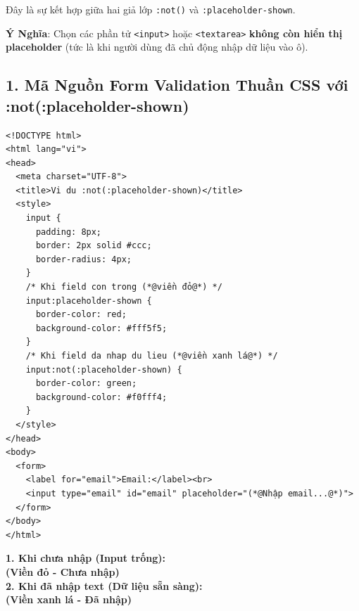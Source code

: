 \documentclass[11pt,oneside]{book}
\newcommand{\codeinline}[1]{\textcolor{accentOrange}{\texttt{#1}}}
\begin{document}
\begin{conceptBox}
Đây là sự kết hợp giữa hai giả lớp \codeinline{:not()} và \codeinline{:placeholder-shown}.
\par\vspace{4pt}
\textbf{ Ý Nghĩa}: Chọn các phần tử \codeinline{<input>} hoặc \codeinline{<textarea>} \textbf{không còn hiển thị placeholder} (tức là khi người dùng đã chủ động nhập dữ liệu vào ô).
\end{conceptBox}

\subsection{1. Mã Nguồn Form Validation Thuần CSS với :not(:placeholder-shown)}

\begin{codeWindow}
\begin{lstlisting}[language=HTML5]
<!DOCTYPE html>
<html lang="vi">
<head>
  <meta charset="UTF-8">
  <title>Vi du :not(:placeholder-shown)</title>
  <style>
    input {
      padding: 8px;
      border: 2px solid #ccc;
      border-radius: 4px;
    }
    /* Khi field con trong (*@viền đỏ@*) */
    input:placeholder-shown {
      border-color: red;
      background-color: #fff5f5;
    }
    /* Khi field da nhap du lieu (*@viền xanh lá@*) */
    input:not(:placeholder-shown) {
      border-color: green;
      background-color: #f0fff4;
    }
  </style>
</head>
<body>
  <form>
    <label for="email">Email:</label><br>
    <input type="email" id="email" placeholder="(*@Nhập email...@*)">
  </form>
</body>
</html>
\end{lstlisting}
\end{codeWindow}

\begin{browserWindow}
\sffamily\small
\textbf{1. Khi chưa nhập (Input trống):}\\[2pt]
 \quad \textcolor{red!70!black}{\bfseries (Viền đỏ - Chưa nhập)}\\[8pt]
\textbf{2. Khi đã nhập text (Dữ liệu sẵn sàng):}\\[2pt]
 \quad \textcolor{green!60!black}{\bfseries (Viền xanh lá - Đã nhập)}
\end{browserWindow}
\end{document}
